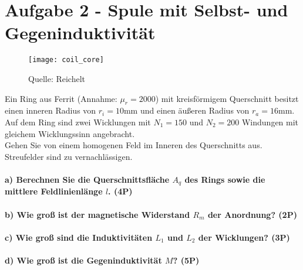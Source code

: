 \documentclass{article}
\begin{document}
\part*{Aufgabe 2 - Spule mit Selbst- und Gegeninduktivität}

\begin{wrapfigure}{r}{0.3\textwidth}
\centering
\texttt{[image: coil\_core]}
\caption*{Quelle: Reichelt}
\end{wrapfigure}
Ein Ring aus Ferrit (Annahme: $\mu_r = 2000$) mit kreisförmigem Querschnitt besitzt einen inneren Radius von $r_i = 10$mm und einen äußeren Radius von $r_a = 16$mm. Auf dem Ring sind zwei Wicklungen mit $N_1 = 150$ und $N_2 = 200$ Windungen mit gleichem Wicklungssinn angebracht.\\Gehen Sie von einem homogenen Feld im Inneren des Querschnitts aus. Streufelder sind zu vernachlässigen.\\
\subsection*{a) Berechnen Sie die Querschnittsfläche $A_q$ des Rings sowie die mittlere Feldlinienlänge $l$. (4P)}

\vspace{15mm}\vspace{15mm}
\subsection*{b) Wie groß ist der magnetische Widerstand $R_m$ der Anordnung? (2P)}

\vspace{15mm}
\subsection*{c) Wie groß sind die Induktivitäten $L_1$ und $L_2$ der Wicklungen? (3P)}

\vspace{15mm}\vspace{15mm}
\subsection*{d) Wie groß ist die Gegeninduktivität $M$? (5P)}

\vspace{15mm}
\end{document}
